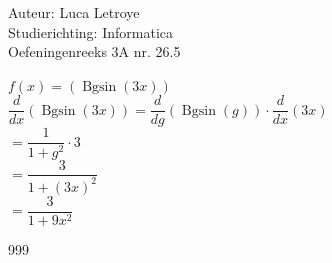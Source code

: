 \documentclass[a4paper]{article}
\newcommand{\ddx}{\dfrac{d}{dx}}
\newcommand{\ddg}{\dfrac{d}{dg}}
\begin{document}
  
\noindent \large Auteur: Luca Letroye \\
\noindent \large Studierichting: Informatica\\
\noindent \large Oefeningenreeks 3A nr. 26.5\\

\medskip


\normalsize

$ f(x) =  \left(\operatorname{Bgsin}{(3x)}\right)  $ \\

$ \ddx \left(\operatorname{Bgsin}{(3x)}\right) = \ddg \left(\operatorname{Bgsin}{(g)}\right) \cdot \ddx (3x) $ \\

$ = \dfrac{1}{1+g^2} \cdot 3 $\\

$ = \dfrac{3}{1+(3x)^2} $\\

$ = \dfrac{3}{1+9x^2}$








\begin{thebibliography}{999}
\end{thebibliography}
\end{document}
